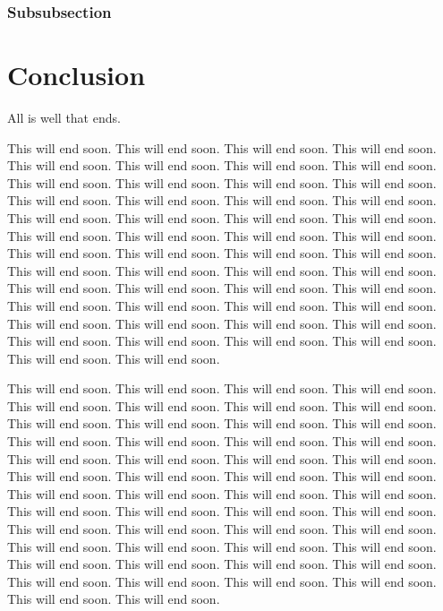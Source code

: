 \documentclass[12pt]{article}
\begin{document}
\subsubsection{Subsubsection}


\section{Conclusion}

All is well that ends.

This will end soon. This will end soon. This will end soon. This will end soon. This will end soon. This will end soon. This will end soon. This will end soon. This will end soon. This will end soon. This will end soon. This will end soon. This will end soon. This will end soon. This will end soon. This will end soon. This will end soon. This will end soon. This will end soon. This will end soon. This will end soon. This will end soon. This will end soon. This will end soon. This will end soon. This will end soon. This will end soon. This will end soon. This will end soon. This will end soon. This will end soon. This will end soon. This will end soon. This will end soon. This will end soon. This will end soon. This will end soon. This will end soon. This will end soon. This will end soon. This will end soon. This will end soon. This will end soon. This will end soon. This will end soon. This will end soon. This will end soon. This will end soon. This will end soon. This will end soon. 

This will end soon. This will end soon. This will end soon. This will end soon. This will end soon. This will end soon. This will end soon. This will end soon. This will end soon. This will end soon. This will end soon. This will end soon. This will end soon. This will end soon. This will end soon. This will end soon. This will end soon. This will end soon. This will end soon. This will end soon. This will end soon. This will end soon. This will end soon. This will end soon. This will end soon. This will end soon. This will end soon. This will end soon. This will end soon. This will end soon. This will end soon. This will end soon. This will end soon. This will end soon. This will end soon. This will end soon. This will end soon. This will end soon. This will end soon. This will end soon. This will end soon. This will end soon. This will end soon. This will end soon. This will end soon. This will end soon. This will end soon. This will end soon. This will end soon. This will end soon. 
\end{document}
